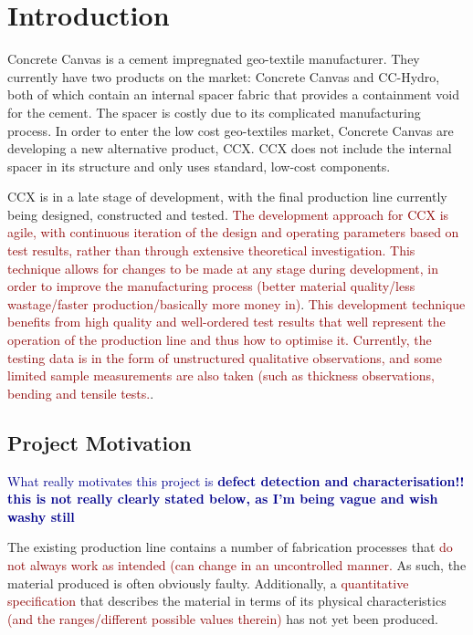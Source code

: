 \documentclass[12pt]{report}
\newcommand{\tcr}[1]{\textcolor{darkRed}{#1}}
\newcommand{\tcb}[1]{\textcolor{darkBlue}{#1}}
\begin{document}
\tableofcontents

\pagebreak
\chapter{Introduction}
    
    Concrete Canvas is a cement impregnated geo-textile manufacturer. They currently have two products on the market: Concrete Canvas and CC-Hydro, both of which contain an internal spacer fabric that provides a containment void for the cement. The spacer is costly due to its complicated manufacturing process. In order to enter the low cost geo-textiles market, Concrete Canvas are developing a new alternative product, CCX. CCX does not include the internal spacer in its structure and only uses standard, low-cost components.
    
    CCX is in a late stage of development, with the final production line currently being designed, constructed and tested. \tcr{The development approach for CCX is agile, with continuous iteration of the design and operating parameters based on test results, rather than through extensive theoretical investigation. This technique allows for changes to be made at any stage during development, in order to improve the manufacturing process (better material quality/less wastage/faster production/basically more money in)}. \tcr{This development technique benefits from high quality and well-ordered test results that well represent the operation of the production line and thus how to optimise it. Currently, the testing data is in the form of unstructured qualitative observations, and some limited sample measurements are also taken (such as thickness observations, bending and tensile tests.}. 
    
    \section{Project Motivation}
        \tcb{What really motivates this project is  \textbf{defect detection and characterisation!! this is not really clearly stated below, as I'm being vague and wish washy still}}
        
        The existing production line contains a number of fabrication processes that \tcr{do not always work as intended (can change in an uncontrolled manner.} As such, the material produced is often obviously faulty. Additionally, a \tcr{quantitative specification} that describes the material in terms of its physical characteristics \tcr{(and the ranges/different possible values therein)} has not yet been produced.
        
\end{document}
